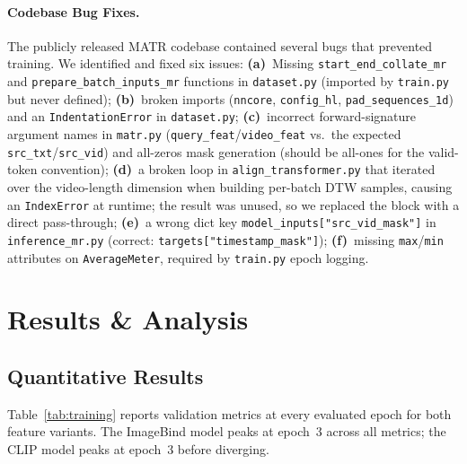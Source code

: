 \documentclass[10pt,twocolumn]{article}
\begin{document}
\paragraph{Codebase Bug Fixes.}
The publicly released MATR codebase contained several bugs that prevented
training. We identified and fixed six issues:
\textbf{(a)}~Missing \texttt{start\_end\_collate\_mr} and
\texttt{prepare\_batch\_inputs\_mr} functions in \texttt{dataset.py}
(imported by \texttt{train.py} but never defined);
\textbf{(b)}~broken imports (\texttt{nncore}, \texttt{config\_hl},
\texttt{pad\_sequences\_1d}) and an \texttt{IndentationError} in
\texttt{dataset.py};
\textbf{(c)}~incorrect forward-signature argument names in \texttt{matr.py}
(\texttt{query\_feat}/\texttt{video\_feat} vs.\ the expected
\texttt{src\_txt}/\texttt{src\_vid}) and all-zeros mask generation (should be
all-ones for the valid-token convention);
\textbf{(d)}~a broken loop in \texttt{align\_transformer.py} that iterated
over the video-length dimension when building per-batch DTW samples, causing an
\texttt{IndexError} at runtime; the result was unused, so we replaced the block
with a direct pass-through;
\textbf{(e)}~a wrong dict key \texttt{model\_inputs["src\_vid\_mask"]}
in \texttt{inference\_mr.py} (correct: \texttt{targets["timestamp\_mask"]});
\textbf{(f)}~missing \texttt{max}/\texttt{min} attributes on
\texttt{AverageMeter}, required by \texttt{train.py} epoch logging.

\section{Results \& Analysis}

\subsection{Quantitative Results}

Table~\ref{tab:training} reports validation metrics at every evaluated epoch
for both feature variants. The ImageBind model peaks at epoch~3 across all
metrics; the CLIP model peaks at epoch~3 before diverging.
\end{document}
